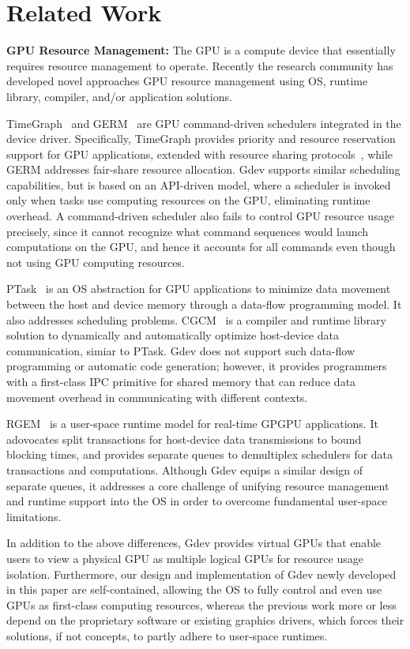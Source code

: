 \section{Related Work}
\label{related_work}

\textbf{GPU Resource Management:}
The GPU is a compute device that essentially requires resource management
to operate.
Recently the research community has developed novel approaches GPU
resource management using OS, runtime library, compiler, and/or
application solutions.

TimeGraph~\cite{Kato_ATC11} and GERM~\cite{Bautin_MCNC08} are GPU
command-driven schedulers integrated in the device driver.
Specifically, TimeGraph provides priority and resource reservation
support for GPU applications, extended with resource sharing
protocols~\cite{Kato_RTAS11}, while GERM addresses fair-share
resource allocation. 
Gdev supports similar scheduling capabilities, but is based on an
API-driven model, where a scheduler is invoked only when tasks use
computing resources on the GPU, eliminating runtime overhead.
A command-driven scheduler also fails to control GPU resource usage
precisely, since it cannot recognize what command sequences would launch
computations on the GPU, and hence it accounts for all commands even
though not using GPU computing resources.

PTask~\cite{Rossbach_SOSP11} is an OS abstraction for GPU applications
to minimize data movement between the host and device memory through
a data-flow programming model.
It also addresses scheduling problems.
CGCM~\cite{Jablin_PLDI11} is a compiler and runtime library solution to
dynamically and automatically optimize host-device data communication,
simiar to PTask.
Gdev does not support such data-flow programming or automatic code
generation; however, it provides programmers with a first-class IPC
primitive for shared memory that can reduce data movement overhead in
communicating with different contexts.

RGEM~\cite{Kato_RTSS11} is a user-space runtime model for real-time
GPGPU applications.
It adovocates split transactions for host-device data transmissions
to bound blocking times, and provides separate queues to demultiplex
schedulers for data transactions and computations.
Although Gdev equips a similar design of separate queues, it
addresses a core challenge of unifying resource management
and runtime support into the OS in order to overcome fundamental
user-space limitations.

In addition to the above differences, Gdev provides virtual GPUs that
enable users to view a physical GPU as multiple logical GPUs for
resource usage isolation.
Furthermore, our design and implementation of Gdev newly developed in
this paper are self-contained, allowing the OS to fully control and even
use GPUs as first-class computing resources, whereas the previous work
more or less depend on the proprietary software or existing graphics
drivers, which forces their solutions, if not concepts, to partly adhere
to user-space runtimes.

